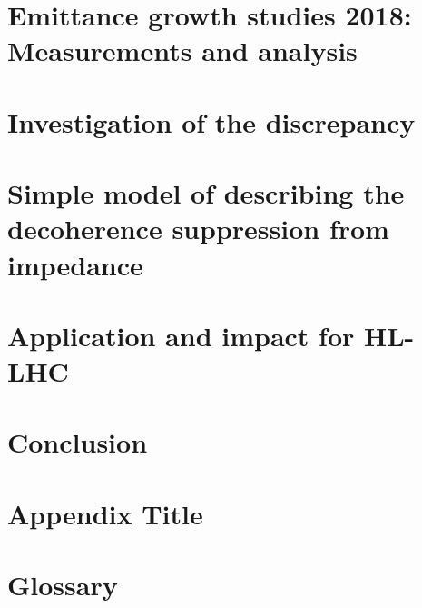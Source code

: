 \documentclass[12pt,twoside]{report} %
\begin{document}
\chapter{Emittance growth studies 2018: Measurements and analysis}\label{Ch:2018_analyisis}


\chapter{Investigation of the discrepancy}


\chapter{Simple model of describing the decoherence suppression from impedance}


\chapter{Application and impact for HL-LHC}


\chapter{Conclusion}


\printglossaries
\appendix
\chapter{Appendix Title}

\chapter{Glossary}


\backmatter
\printbibliography
{}
\end{document}
